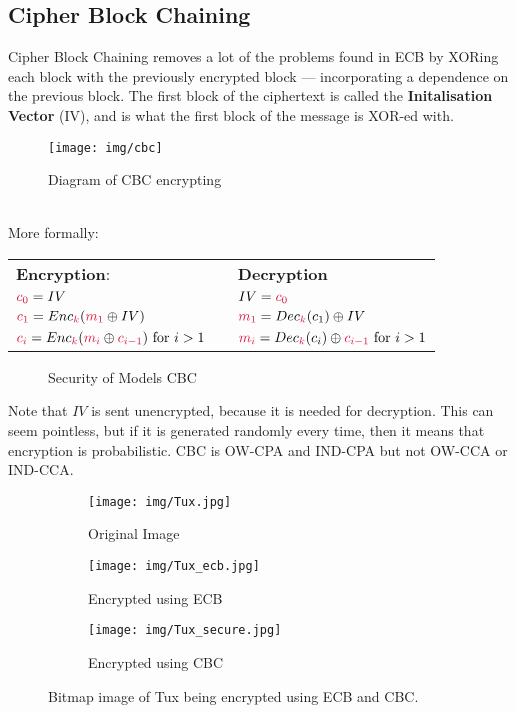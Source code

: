     \subsection{Cipher Block Chaining}
    Cipher Block Chaining removes a lot of the problems found in ECB by XORing each block with the previously encrypted block --- incorporating a dependence on the previous block. The first block of the ciphertext is called the \textbf{Initalisation Vector} (IV), and is what the first block of the message is XOR-ed with.\\
    \begin{figure}[htp!]
        \centering
        \texttt{[image: img/cbc]}
        \caption{Diagram of CBC encrypting}
    \end{figure}
    \\
    More formally:\nopagebreak
    \begin{center}
    \begin{tabular}{lll}
    \textbf{Encryption}:                                        && \textbf{Decryption}\\
    $\csubc{0} = IV$                                                  && $IV = \csubc{0}$\\
    $\csubc{1} = Enc_\ck(\csubm{1} \oplus IV)$                                && $\csubm{1} = Dec_\ck(c_1) \oplus IV$\\
    $\csubc{i} = Enc_\ck(\csubm{i} \oplus \csubc{i-1}) \textrm{ for } i > 1$      && $\csubm{i} = Dec_\ck(c_i) \oplus \csubc{i-1} \textrm{ for } i > 1$\\
    \end{tabular}
    \end{center}
    \begin{figure}[htp!]
        \centering
        \caption{Security of Models CBC}
        \label{fig:cbc-attacktable}
    \end{figure}
    Note that $IV$ is sent unencrypted, because it is needed for decryption. This can seem pointless, but if it is generated randomly every time, then it means that encryption is probabilistic. CBC is OW-CPA and IND-CPA but not OW-CCA or IND-CCA.\\
    \begin{figure}[htp!]
        \centering
        \begin{subfigure}[b]{0.3\textwidth}
            \centering
            \texttt{[image: img/Tux.jpg]}
            \caption{Original Image}
        \end{subfigure}
        \begin{subfigure}[b]{0.3\textwidth}
            \centering
            \texttt{[image: img/Tux\_ecb.jpg]}
            \caption{Encrypted using ECB}
        \end{subfigure}
        \begin{subfigure}[b]{0.3\textwidth}
            \centering
            \texttt{[image: img/Tux\_secure.jpg]}
            \caption{Encrypted using CBC}
        \end{subfigure}
        \caption{Bitmap image of Tux being encrypted using ECB and CBC.}
        \label{fig:tux}
    \end{figure}
